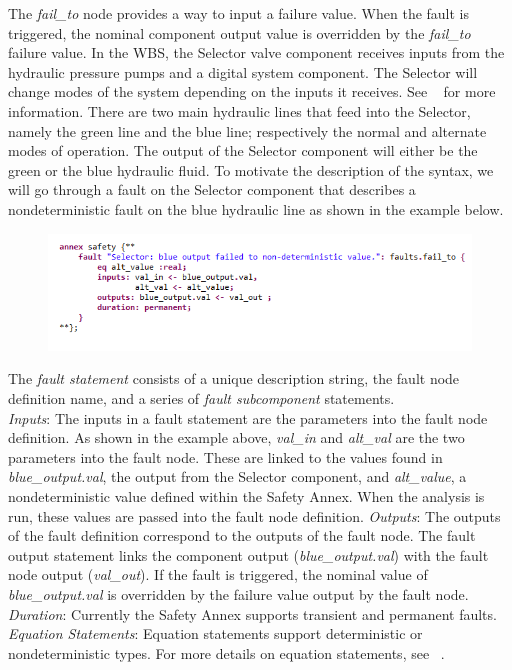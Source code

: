 The \textit{fail\_to} node provides a way to input a failure value. When the fault is triggered, the nominal component output value is overridden by the \textit{fail\_to} failure value. In the WBS, the Selector valve component receives inputs from the hydraulic pressure pumps and a digital system component. The Selector will change modes of the system depending on the inputs it receives. See ~\cite{AIR6110,Stewart17:IMBSA} for more information. There are two main hydraulic lines that feed into the Selector, namely the green line and the blue line; respectively the normal and alternate modes of operation. The output of the Selector component will either be the green or the blue hydraulic fluid. To motivate the description of the syntax, we will go through a fault on the Selector component that describes a nondeterministic fault on the blue hydraulic line as shown in the example below.
\begin{figure}[h!]
\vspace{-0.17in}
\begin{center}
\includegraphics[trim=0 15 0 11,clip,width=1.0\textwidth]{images/annex.png}
\end{center}
\vspace{-0.40in}
\end{figure}

The \textit{fault statement} consists of a unique description string, the fault node definition name, and a series of \textit{fault subcomponent} statements. \\
\textit{Inputs}: The inputs in a fault statement are the parameters into the fault node definition. As shown in the example above, \textit{val\_in} and \textit{alt\_val} are the two parameters into the fault node. These are linked to the values found in \textit{blue\_output.val}, the output from the Selector component, and \textit{alt\_value}, a nondeterministic value defined within the Safety Annex. When the analysis is run, these values are passed into the fault node definition.
\textit{Outputs}: The outputs of the fault definition correspond to the outputs of the fault node. The fault output statement links the component output (\textit{blue\_output.val}) with the fault node output (\textit{val\_out}). If the fault is triggered, the nominal value of \textit{blue\_output.val} is overridden by the failure value output by the fault node.
\textit{Duration}: Currently the Safety Annex supports transient and permanent faults.
\textit{Equation Statements}: Equation statements support deterministic or nondeterministic types. For more details on equation statements, see ~\cite{NFM2012:CoGaMiWhLaLu}.\\





